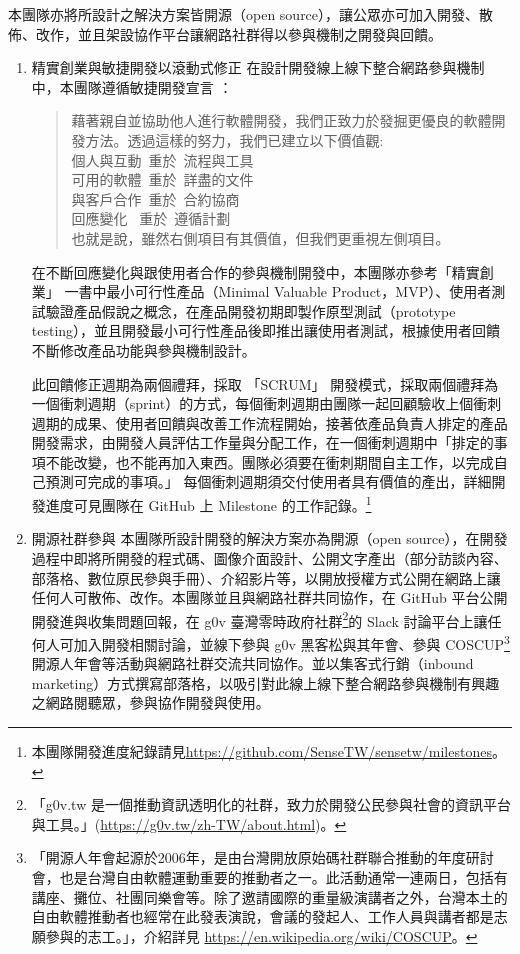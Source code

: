 \documentclass[12pt,a4paper]{article}
\begin{document}
本團隊亦將所設計之解決方案皆開源（open source），讓公眾亦可加入開發、散佈、改作，並且架設協作平台讓網路社群得以參與機制之開發與回饋。
\begin{enumerate}
\item 精實創業與敏捷開發以滾動式修正
\label{sec:org61fe0cc}
在設計開發線上線下整合網路參與機制中，本團隊遵循敏捷開發宣言 \cite{agile_development} ：

\begin{verse}
藉著親自並協助他人進行軟體開發，我們正致力於發掘更優良的軟體開發方法。透過這樣的努力，我們已建立以下價值觀:\\
\vspace*{1em}
個人與互動 重於 流程與工具\\
可用的軟體 重於 詳盡的文件\\
與客戶合作 重於 合約協商\\
回應變化   重於 遵循計劃\\
\vspace*{1em}
也就是說，雖然右側項目有其價值，但我們更重視左側項目。\\
\end{verse}

在不斷回應變化與跟使用者合作的參與機制開發中，本團隊亦參考「精實創業」 \cite{lai17_jing} 一書中最小可行性產品（Minimal Valuable Product，MVP）、使用者測試驗證產品假說之概念，在產品開發初期即製作原型測試（prototype testing），並且開發最小可行性產品後即推出讓使用者測試，根據使用者回饋不斷修改產品功能與參與機制設計。

此回饋修正週期為兩個禮拜，採取 「SCRUM」\cite{sutherland18_scrum} 開發模式，採取兩個禮拜為一個衝刺週期（sprint）的方式，每個衝刺週期由團隊一起回顧驗收上個衝刺週期的成果、使用者回饋與改善工作流程開始，接著依產品負責人排定的產品開發需求，由開發人員評估工作量與分配工作，在一個衝刺週期中「排定的事項不能改變，也不能再加入東西。團隊必須要在衝刺期間自主工作，以完成自己預測可完成的事項。」\citep[p. 328]{sutherland18_scrum} 每個衝刺週期須交付使用者具有價值的產出，詳細開發進度可見團隊在 GitHub 上 Milestone 的工作記錄。\footnote{本團隊開發進度紀錄請見\url{https://github.com/SenseTW/sensetw/milestones}。}
\item 開源社群參與
\label{sec:orgb3a37d6}
本團隊所設計開發的解決方案亦為開源（open source），在開發過程中即將所開發的程式碼、圖像介面設計、公開文字產出（部分訪談內容、部落格、數位原民參與手冊）、介紹影片等，以開放授權方式公開在網路上讓任何人可散佈、改作。本團隊並且與網路社群共同協作，在 GitHub 平台公開開發進與收集問題回報，在 g0v 臺灣零時政府社群\footnote{「g0v.tw 是一個推動資訊透明化的社群，致力於開發公民參與社會的資訊平台與工具。」(\url{https://g0v.tw/zh-TW/about.html})。}的 Slack 討論平台上讓任何人可加入開發相關討論，並線下參與 g0v 黑客松與其年會、參與 COSCUP\footnote{「開源人年會起源於2006年，是由台灣開放原始碼社群聯合推動的年度研討會，也是台灣自由軟體運動重要的推動者之一。此活動通常一連兩日，包括有講座、攤位、社團同樂會等。除了邀請國際的重量級演講者之外，台灣本土的自由軟體推動者也經常在此發表演說，會議的發起人、工作人員與講者都是志願參與的志工。」，介紹詳見 \url{https://en.wikipedia.org/wiki/COSCUP}。} 開源人年會等活動與網路社群交流共同協作。並以集客式行銷（inbound marketing）方式撰寫部落格，以吸引對此線上線下整合網路參與機制有興趣之網路閱聽眾，參與協作開發與使用。


\end{enumerate}
\end{document}
